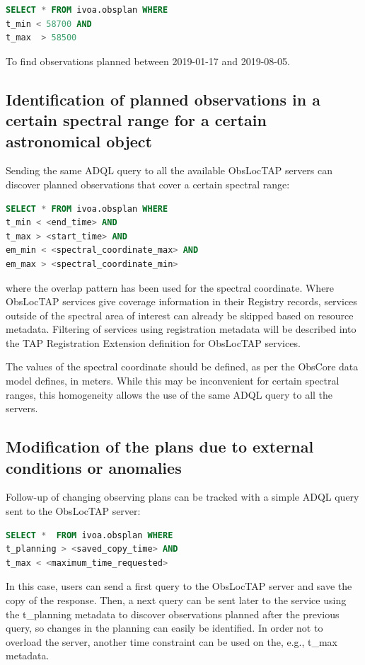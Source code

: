 \documentclass[11pt,a4paper]{ivoa}
\begin{document}
\begin{lstlisting}[language=SQL]
SELECT * FROM ivoa.obsplan WHERE
t_min < 58700 AND
t_max  > 58500
\end{lstlisting}

To find observations planned between 2019-01-17 and 2019-08-05.

\subsection{Identification of planned observations in a certain spectral range
for a certain astronomical object}
Sending the same ADQL query to all the available ObsLocTAP servers can discover
planned observations that cover a certain spectral range:

\begin{lstlisting}[language=SQL]
SELECT * FROM ivoa.obsplan WHERE
t_min < <end_time> AND
t_max > <start_time> AND
em_min < <spectral_coordinate_max> AND
em_max > <spectral_coordinate_min>
\end{lstlisting}
where the overlap pattern has been used for the spectral coordinate.
Where ObsLocTAP services give coverage information in their Registry records,
services outside of the spectral area of interest can already be skipped based
on resource metadata. Filtering of services using registration metadata will be
described into the TAP Registration Extension definition for ObsLocTAP services.
\par

The values of the spectral coordinate should be defined, as per the ObsCore data
model defines, in meters. While this may be inconvenient for certain spectral
ranges, this homogeneity allows the use of the same ADQL query to all the
servers.

\subsection{Modification of the plans due to external conditions or anomalies}
Follow-up of changing observing plans can be tracked with a simple ADQL query
sent to the ObsLocTAP server:


\begin{lstlisting}[language=SQL]
SELECT *  FROM ivoa.obsplan WHERE
t_planning > <saved_copy_time> AND
t_max < <maximum_time_requested>
\end{lstlisting}
In this case, users can send a first query to the ObsLocTAP server and save the
copy of the response. Then, a next query can be sent later to the service using
the t\_planning metadata to discover observations planned after the previous
query, so changes in the planning can easily be identified. In order not to
overload the server, another time constraint can be used on the, e.g., t\_max
metadata.
\par
\end{document}
